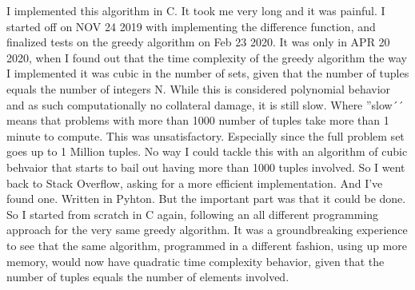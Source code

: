 I implemented this algorithm in C. 
It took me very long and it was painful.
I started off on NOV 24 2019 with implementing the difference function, and finalized tests on the greedy algorithm on Feb 23 2020.
It was only in APR 20 2020, when I found out that the time complexity of the greedy algorithm the way I implemented it was cubic in the number of sets, given that the number of tuples equals the number of integers N.
While this is considered polynomial behavior and as such computationally no collateral damage, it is still slow.
Where ''slow´´ means that problems with more than 1000 number of tuples take more than 1 minute to compute.
This was unsatisfactory.
Especially since the full problem set goes up to 1 Million tuples.
No way I could tackle this with an algorithm of cubic behvaior that starts to bail out having more than 1000 tuples involved.
So I went back to Stack Overflow, asking for a more efficient implementation.
And I've found one.
Written in Pyhton.
But the important part was that it could be done.
So I started from scratch in C again, following an all different programming approach for the very same greedy algorithm.
It was a groundbreaking experience to see that the same algorithm, programmed in a different fashion, using up more memory, would now have quadratic time complexity behavior, given that the number of tuples equals the number of elements involved.
